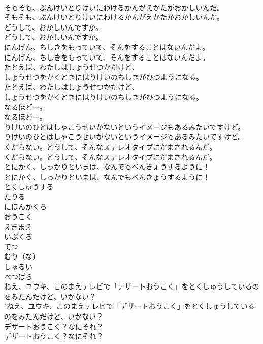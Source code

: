 \documentclass[8pt]{extreport}
\begin{document}
\begin{CJK}{UTF8}{min}
\\	そもそも、ぶんけいとりけいにわけるかんがえかたがおかしいんだ。	
\\	そもそも、ぶんけいとりけいにわけるかんがえかたがおかしいんだ。 
\\	どうして、おかしいんですか。	
\\	どうして、おかしいんですか。 
\\	にんげん、ちしきをもっていて、そんをすることはないんだよ。	
\\	にんげん、ちしきをもっていて、そんをすることはないんだよ。 
\\	たとえば、わたしはしょうせつかだけど、
\\	しょうせつをかくときにはりけいのちしきがひつようになる。	
\\	たとえば、わたしはしょうせつかだけど、
\\	しょうせつをかくときにはりけいのちしきがひつようになる。 
\\	なるほどー。	
\\	なるほどー。 
\\	りけいのひとはしゃこうせいがないというイメージもあるみたいですけど。	
\\	りけいのひとはしゃこうせいがないというイメージもあるみたいですけど。 
\\	くだらない。どうして、そんなステレオタイプにだまされるんだ。	
\\	くだらない。どうして、そんなステレオタイプにだまされるんだ。 
\\	とにかく、しっかりといまは、なんでもべんきょうするように！	
\\	とにかく、しっかりといまは、なんでもべんきょうするように！ 
\\	とくしゅうする
\\	たりる
\\	にほんかくち
\\	おうこく
\\	えきまえ
\\	いぶくろ
\\	てつ
\\	むり（な）
\\	しゅるい
\\	べつばら
\\	ねえ、ユウキ、このまえテレビで「デザートおうこく」をとくしゅうしているのをみたんだけど、いかない？	
\\	"ねえ、ユウキ、このまえテレビで「デザートおうこく」をとくしゅうしているのをみたんだけど、いかない？ 
\\	デザートおうこく？なにそれ？	
\\	デザートおうこく？なにそれ？ 

\end{CJK}
\end{document}

